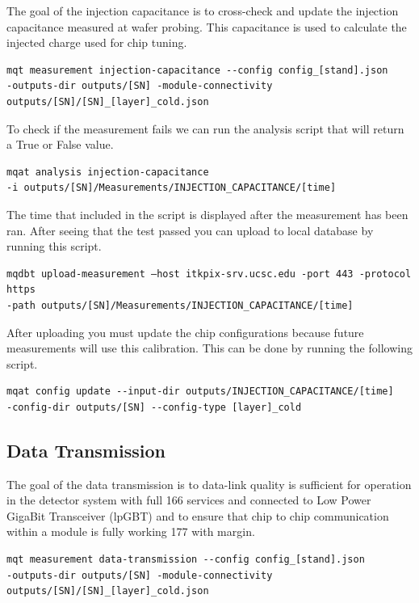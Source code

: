 \documentclass[12pt]{article}
\begin{document}
The goal of the injection capacitance is to cross-check and update the injection capacitance measured at wafer probing. This capacitance is used to calculate the injected charge used for chip tuning. 

\begin{verbatim}
mqt measurement injection-capacitance --config config_[stand].json 
-outputs-dir outputs/[SN] -module-connectivity outputs/[SN]/[SN]_[layer]_cold.json
\end{verbatim}

To check if the measurement fails we can run the analysis script that will return a True or False value. 
\begin{verbatim}
mqat analysis injection-capacitance 
-i outputs/[SN]/Measurements/INJECTION_CAPACITANCE/[time]
\end{verbatim}

The time that included in the script is displayed after the measurement has been ran. After seeing that the test passed you can upload to local database by running this script. 

\begin{verbatim}
mqdbt upload-measurement –host itkpix-srv.ucsc.edu -port 443 -protocol https
-path outputs/[SN]/Measurements/INJECTION_CAPACITANCE/[time]
\end{verbatim}
After uploading you must update the chip configurations because future measurements will use this calibration. This can be done by running the following script. 
\begin{verbatim}
mqat config update --input-dir outputs/INJECTION_CAPACITANCE/[time] 
-config-dir outputs/[SN] --config-type [layer]_cold
\end{verbatim}

\subsection{Data Transmission}

The goal of the data transmission is to data-link quality is sufficient for operation in the detector system with full
166 services and connected to Low Power GigaBit Transceiver (lpGBT) and to ensure that chip to chip communication within a module is fully working 177
with margin.

\begin{verbatim}
mqt measurement data-transmission --config config_[stand].json 
-outputs-dir outputs/[SN] -module-connectivity outputs/[SN]/[SN]_[layer]_cold.json
\end{verbatim}
\end{document}
